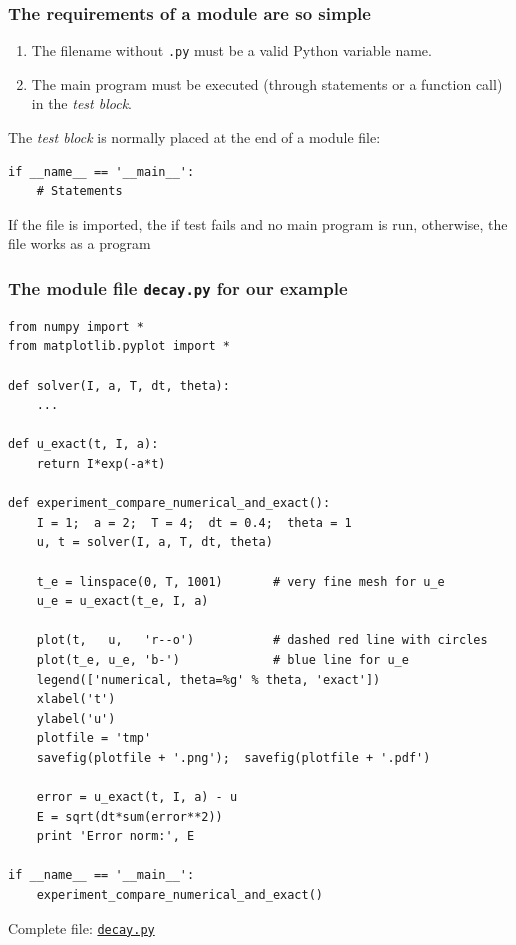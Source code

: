 \documentclass{beamer}
\begin{document}
\begin{frame}
\frametitle{The requirements of a module are so simple}

\begin{enumerate}
\item The filename without \texttt{.py} must be a valid Python variable name.

\item The main program must be executed (through statements or
   a function call) in the \emph{test block}.
\end{enumerate}

\noindent
The \emph{test block} is normally placed at the end of a module file:

\begin{verbatim}
if __name__ == '__main__':
    # Statements
\end{verbatim}

If the file is imported, the if test fails and no main program is run,
otherwise, the file works as a program
\end{frame}

\begin{frame}
\frametitle{The module file \texttt{decay.py} for our example}

\begin{verbatim}
from numpy import *
from matplotlib.pyplot import *

def solver(I, a, T, dt, theta):
    ...

def u_exact(t, I, a):
    return I*exp(-a*t)

def experiment_compare_numerical_and_exact():
    I = 1;  a = 2;  T = 4;  dt = 0.4;  theta = 1
    u, t = solver(I, a, T, dt, theta)

    t_e = linspace(0, T, 1001)       # very fine mesh for u_e
    u_e = u_exact(t_e, I, a)

    plot(t,   u,   'r--o')           # dashed red line with circles
    plot(t_e, u_e, 'b-')             # blue line for u_e
    legend(['numerical, theta=%g' % theta, 'exact'])
    xlabel('t')
    ylabel('u')
    plotfile = 'tmp'
    savefig(plotfile + '.png');  savefig(plotfile + '.pdf')

    error = u_exact(t, I, a) - u
    E = sqrt(dt*sum(error**2))
    print 'Error norm:', E

if __name__ == '__main__':
    experiment_compare_numerical_and_exact()
\end{verbatim}

Complete file: \href{{http://tinyurl.com/ofkw6kc/softeng/decay.py}}{\nolinkurl{decay.py}}
\end{frame}
\end{document}
